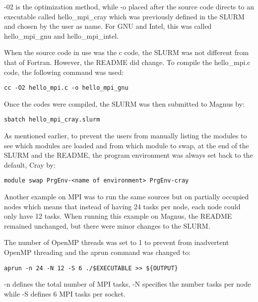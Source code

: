-02 is the optimization method, while -o placed after the source code directs to an executable called hello\_mpi\_cray which was previously defined in
the SLURM and chosen by the user as name. For GNU and Intel, this was called hello\_mpi\_gnu and hello\_mpi\_intel. 

When the source code in use was the c code, the SLURM was not different from that of Fortran. However, the README did change. 
To compile the hello\_mpi.c code, the following command was used: 

\begin{tcolorbox}
\begin{Verbatim}[fontsize=\scriptsize]
cc -O2 hello_mpi.c -o hello_mpi_gnu
\end{Verbatim}
\end{tcolorbox}

Once the codes were compiled, the SLURM was then submitted to Magnus by:

\begin{tcolorbox}
\begin{Verbatim}[fontsize=\scriptsize]
sbatch hello_mpi_cray.slurm 
\end{Verbatim}
\end{tcolorbox}

As mentioned earlier, to prevent the users from manually listing the modules to see which modules are loaded and from which module to swap, at the end
of the SLURM and the README, the program environment was always set back to the default, Cray by:

\begin{tcolorbox}
\begin{Verbatim}[fontsize=\scriptsize]
module swap PrgEnv-<name of environment> PrgEnv-cray
\end{Verbatim}
\end{tcolorbox}

Another example on MPI was to run the same sources but on partially occupied nodes which means that instead of having 24 tasks per node, each node could
only have 12 tasks. When running this example on Magnus, the README remained unchanged, but there were minor changes to the SLURM.

The number of OpenMP threads was set to 1 to prevent from inadvertent OpenMP threading and the aprun command was changed to:

\begin{tcolorbox}
\begin{Verbatim}[fontsize=\scriptsize]
aprun -n 24 -N 12 -S 6 ./$EXECUTABLE >> ${OUTPUT}
\end{Verbatim}
\end{tcolorbox}

-n defines the total number of MPI tasks, -N specifies the number tasks per node while -S defines 6 MPI tasks per socket.

